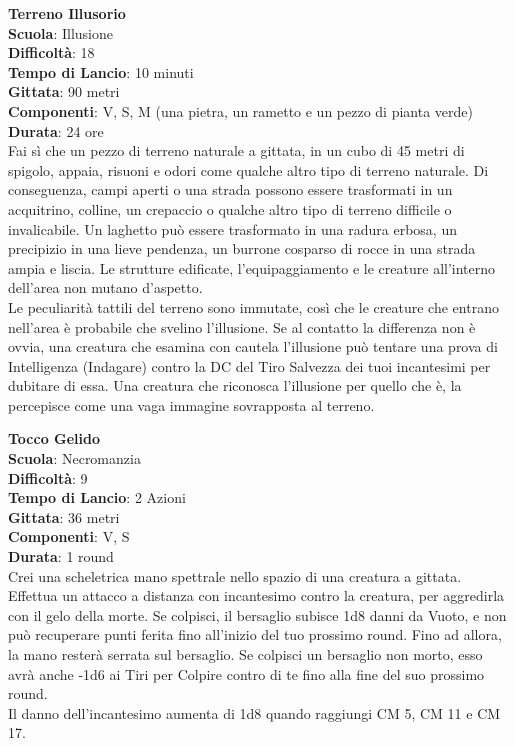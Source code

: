 \begin{multicols}{2}
\medskip\textbf{Terreno Illusorio}\\
\textbf{Scuola}: Illusione\\
\textbf{Difficoltà}: 18\\
\textbf{Tempo di Lancio}: 10 minuti\\
\textbf{Gittata}: 90 metri\\
\textbf{Componenti}: V, S, M (una pietra, un rametto e un pezzo di pianta verde)\\
\textbf{Durata}: 24 ore \\
Fai sì che un pezzo di terreno naturale a gittata, in un cubo di 45 metri di spigolo, appaia, risuoni e odori come qualche altro tipo di terreno naturale. Di conseguenza, campi aperti o una strada possono essere trasformati in un acquitrino, colline, un crepaccio o qualche altro tipo di terreno difficile o invalicabile. Un laghetto può essere trasformato in una radura erbosa, un precipizio in una lieve pendenza, un burrone cosparso di rocce in una strada ampia e liscia. Le strutture edificate, l'equipaggiamento e le creature all'interno dell'area non mutano d'aspetto.\\
Le peculiarità tattili del terreno sono immutate, così che le creature che entrano nell'area è probabile che svelino l'illusione. Se al contatto la differenza non è ovvia, una creatura che esamina con cautela l'illusione può tentare una prova di Intelligenza (Indagare) contro la DC del Tiro Salvezza dei tuoi incantesimi per dubitare di essa. Una creatura che riconosca l'illusione per quello che è, la percepisce come una vaga immagine sovrapposta al terreno.

\medskip\textbf{Tocco Gelido}\\
\textbf{Scuola}: Necromanzia\\
\textbf{Difficoltà}: 9\\
\textbf{Tempo di Lancio}: 2 Azioni\\
\textbf{Gittata}: 36 metri\\
\textbf{Componenti}: V, S\\
\textbf{Durata}: 1 round\\
Crei una scheletrica mano spettrale nello spazio di una creatura a gittata. Effettua un attacco a distanza con incantesimo contro la creatura, per aggredirla con il gelo della morte. Se colpisci, il bersaglio subisce 1d8 danni da Vuoto, e non può recuperare punti ferita fino all'inizio del tuo prossimo round. Fino ad allora, la mano resterà serrata sul bersaglio. Se colpisci un bersaglio non morto, esso avrà anche -1d6 ai Tiri per Colpire contro di te fino alla fine del suo prossimo round.\\
Il danno dell'incantesimo aumenta di 1d8 quando raggiungi CM 5, CM 11 e CM 17.


\end{multicols}

